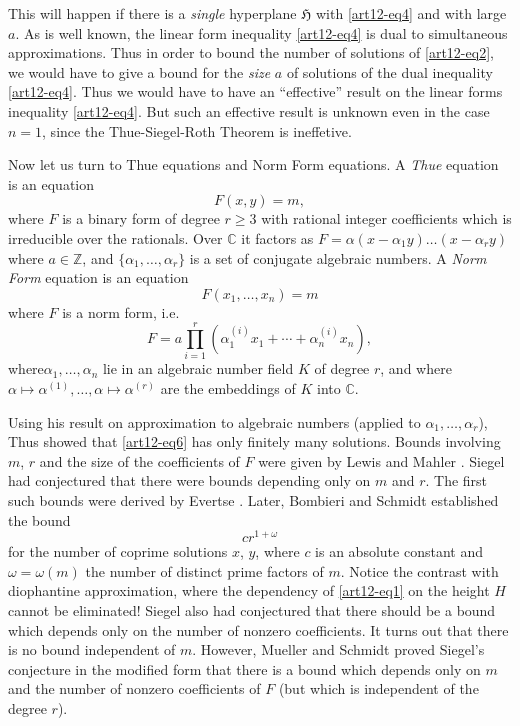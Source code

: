 This will happen if there is a {\em single} hyperplane $\mathfrak{H}$ with \eqref{art12-eq4} and with large $a$. As is well known, the linear form inequality \eqref{art12-eq4} is dual to simultaneous approximations. Thus in order to bound the number of solutions of \eqref{art12-eq2}, we would have to give a bound for the {\em size} $a$ of solutions of the dual inequality \eqref{art12-eq4}. Thus we would have to have an ``effective'' result on the linear forms inequality \eqref{art12-eq4}. But such an effective result is unknown even in the case $n=1$, since the Thue-Siegel-Roth Theorem is ineffetive.

Now let us turn to Thue equations and Norm Form equations. A {\em Thue} equation is an equation
\begin{equation}
F(x,y)=m,\label{art12-eq6}
\end{equation}
where $F$ is a binary form of degree $r\geq 3$ with rational integer coefficients which is irreducible over the rationals. Over $\mathbb{C}$ it factors as $F=\alpha(x-\alpha_{1}y)\ldots(x-\alpha_{r}y)$ where $a\in \mathbb{Z}$, and $\{\alpha_{1},\ldots,\alpha_{r}\}$ is a set of conjugate algebraic numbers. A {\em Norm Form} equation is an equation
\begin{equation}
F(x_{1},\ldots,x_{n})=m\label{art12-eq7}
\end{equation}
where $F$ is a norm form, i.e.
$$
F=a\prod\limits^{r}_{i=1}(\alpha_{1}^{(i)}x_{1}+\cdots+\alpha^{(i)}_{n}x_{n}),
$$
where\pageoriginale $\alpha_{1},\ldots,\alpha_{n}$ lie in an algebraic number field $K$ of degree $r$, and where $\alpha\mapsto \alpha^{(1)},\ldots,\alpha\mapsto \alpha^{(r)}$ are the embeddings of $K$ into $\mathbb{C}$.

Using his result on approximation to algebraic numbers (applied to $\alpha_{1},\ldots,\alpha_{r}$), Thus showed that \eqref{art12-eq6} has only finitely many solutions. Bounds involving $m$, $r$ and the size of the coefficients of $F$ were given by Lewis and Mahler \cite{art12-key6}. Siegel \cite{art12-key14} had conjectured that there were bounds depending only on $m$ and $r$. The first such bounds were derived by Evertse \cite{art12-key5}. Later, Bombieri and Schmidt \cite{art12-key1} established the bound
$$
cr^{1+\omega}
$$
for the number of coprime solutions $x$, $y$, where $c$ is an absolute constant and $\omega=\omega(m)$ the number of distinct prime factors of $m$. Notice the contrast with diophantine approximation, where the dependency of \eqref{art12-eq1} on the height $H$ cannot be eliminated! Siegel also had conjectured that there should be a bound which depends only on the number of nonzero coefficients. It turns out that there is no bound independent of $m$. However, Mueller and Schmidt \cite{art12-key7} proved Siegel's conjecture in the modified form that there is a bound which depends only on $m$ and the number of nonzero coefficients of $F$ (but which is independent of the degree $r$).

